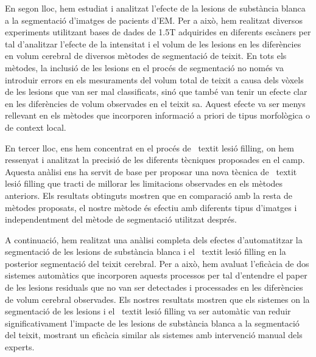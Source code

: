 En segon lloc, hem estudiat i analitzat l'efecte de la lesions de substància blanca a la segmentació d'imatges de pacients d'EM. Per a això, hem realitzat diversos experiments utilitzant bases de dades de 1.5T adquirides en diferents escàners per tal d'analitzar l'efecte de la intensitat i el volum de les lesions en les diferències en volum cerebral de diversos mètodes de segmentació de teixit. En tots els mètodes, la inclusió de les lesions en el procés de segmentació no només va introduir errors en els mesuraments del volum total de teixit a causa dels vòxels de les lesions que van ser mal classificats, sinó que també van tenir un efecte clar en les diferències de volum observades en el teixit sa. Aquest efecte va ser menys rellevant en els mètodes que incorporen informació a priori de tipus morfològica o de context local.

En tercer lloc, ens hem concentrat en el procés de \ textit {lesió filling}, on hem ressenyat i analitzat la precisió de les diferents tècniques proposades en el camp. Aquesta anàlisi ens ha servit de base per proposar una nova tècnica de \ textit {lesió filling} que tracti de millorar les limitacions observades en els mètodes anteriors. Els resultats obtinguts mostren que en comparació amb la resta de mètodes proposats, el nostre mètode és efectiu amb diferents tipus d'imatges i independentment del mètode de segmentació utilitzat després.

A continuació, hem realitzat una anàlisi completa dels efectes d'automatitzar la segmentació de les lesions de substància blanca i el \ textit {lesió filling}
en la posterior segmentació del teixit cerebral. Per a això, hem avaluat l'eficàcia de dos sistemes automàtics que incorporen aquests processos per tal d'entendre el paper de les lesions residuals que no van ser detectades i processades en les diferències de volum cerebral observades. Els nostres resultats mostren que els sistemes on la segmentació de les lesions i el \ textit {lesió filling} va ser automàtic van reduir significativament l'impacte de les lesions de substància blanca a la segmentació del teixit, mostrant un eficàcia similar als sistemes amb intervenció manual dels experts.

